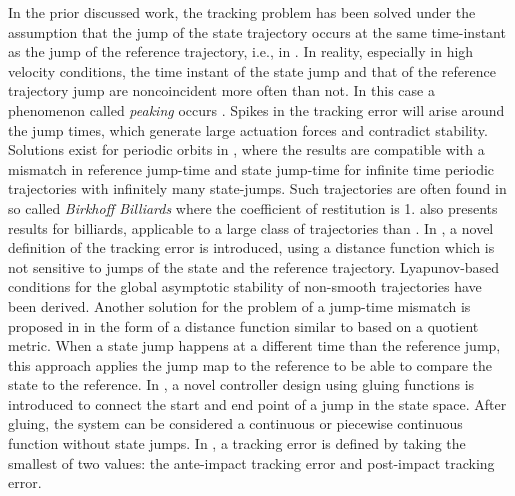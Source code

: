 \documentclass[../DC2017114Bouma.tex]{subfiles}
\begin{document}
In the prior discussed work, the tracking problem has been solved under the assumption that the jump of the state trajectory occurs at the same time-instant as the jump of the reference trajectory, i.e., in \cite{Naldi2013,Sanfelice2014,Posa2016}. In reality, especially in high velocity conditions, the time instant of the state jump and that of the reference trajectory jump are noncoincident more often than not. In this case a phenomenon called \textit{peaking} occurs \cite{Biemond2013}. Spikes in the tracking error will arise around the jump times, which generate large actuation forces and contradict stability. Solutions exist for periodic orbits in \cite{Menini2001,Galeani2008}, where the results are compatible with a mismatch in reference jump-time and state jump-time for infinite time periodic trajectories with infinitely many state-jumps. Such trajectories are often found in so called \textit{Birkhoff Billiards} where the coefficient of restitution is 1. \cite{Forni2013} also presents results for billiards, applicable to a large class of trajectories than \cite{Menini2001,Galeani2008}. In \cite{Biemond2013,Biemond2016}, a novel definition of the tracking error is introduced, using a distance function which is not sensitive to jumps of the state and the reference trajectory. Lyapunov-based conditions for the global asymptotic stability of non-smooth trajectories have been derived. Another solution for the problem of a jump-time mismatch is proposed in \cite{Baumann2018} in the form of a distance function similar to \cite{Biemond2013,Biemond2016} based on a quotient metric. When a state jump happens at a different time than the reference jump, this approach applies the jump map to the reference to be able to compare the state to the reference. In \cite{Kim2016}, a novel controller design using gluing functions is introduced to connect the start and end point of a jump in the state space. After gluing, the system can be considered a continuous or piecewise continuous function without state jumps. In \cite{Yang2017}, a tracking error is defined by taking the smallest of two values: the ante-impact tracking error and post-impact tracking error.
\end{document}
